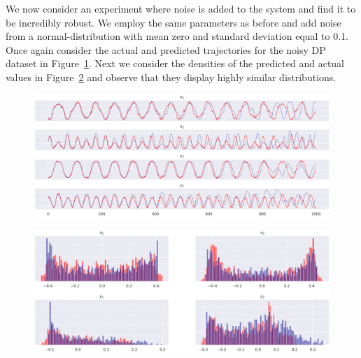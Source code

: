 \documentclass[a4paper,12pt,twoside]{report}
\begin{document}
We now consider an experiment where noise is added to the system and find it to be incredibly robust. We employ the same parameters as before and add noise from a normal-distribution with mean zero and standard deviation equal to 0.1.
Once again consider the actual and predicted trajectories for the noisy DP dataset in Figure~\ref{fig:noisydp_success_traj}. Next we consider the densities of the predicted and actual values in Figure~\ref{fig:noisydp_success_density} and observe that they display highly similar distributions.

\begin{figure}[ht]
  \centering
  \includegraphics[width=0.95\linewidth]{_dp_noise_FigCD_2030.eps} 
  \label{fig:noisydp_success_traj}
\end{figure}
\begin{figure}[ht]
  \centering
  \includegraphics[width=\linewidth]{_dp_noise_2B_2030.eps}
  \label{fig:noisydp_success_density}
 \end{figure}
\end{document}
